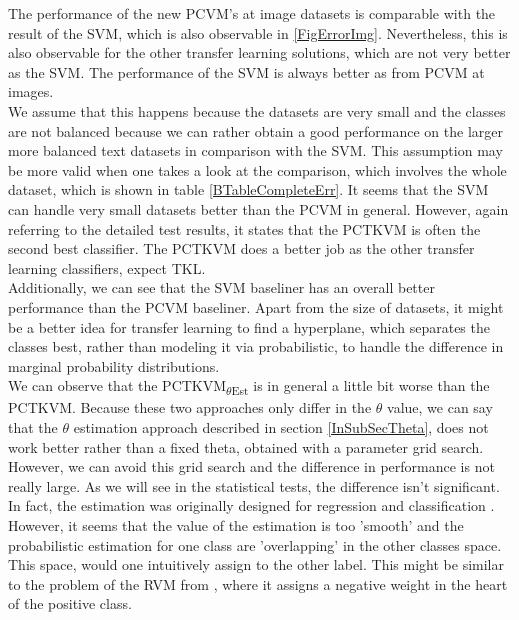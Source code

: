 \noindent
The performance of the new \acs{PCVM}'s at image datasets is comparable with the result of the \acs{SVM}, which is also observable in \ref{FigErrorImg}.
Nevertheless, this is also observable for the other transfer learning solutions, which are not very better as the \acs{SVM}.
The performance of the \acs{SVM} is always better as from \acs{PCVM} at images.\\
We assume that this happens because the datasets are very small and the classes are not balanced because we can rather obtain a good performance on the larger more balanced text datasets in comparison with the \acs{SVM}.
This assumption may be more valid when one takes a look at the comparison, which involves the whole dataset, which is shown in table \ref{BTableCompleteErr}.
It seems that the \acs{SVM} can handle very small datasets better than the \acs{PCVM} in general.
However, again referring to the detailed test results, it states that the \acs{PCTKVM} is often the second best classifier.
The \acs{PCTKVM} does a better job as the other transfer learning classifiers, expect \acs{TKL}.\\
Additionally, we can see that the \acs{SVM} baseliner has an overall better performance than the \acs{PCVM} baseliner.
Apart from the size of datasets, it might be a better idea for transfer learning to find a hyperplane, which separates the classes best, rather than modeling it via probabilistic, to handle the difference in marginal probability distributions.\\
We can observe that the \acs{PCTKVM}\textsubscript{$\theta$Est} is in general a little bit worse than the \acs{PCTKVM}. 
Because these two approaches only differ in the $\theta$ value, we can say that the $\theta$ estimation approach described in section \ref{InSubSecTheta}, does not work better rather than a fixed theta, obtained with a parameter grid search. However, we can avoid this grid search and the difference in performance is not really large. As we will see in the statistical tests, the difference isn't significant.
In fact, the estimation was originally designed for regression and classification \cite{Kitayama.2011}. However, it seems that the value of the estimation is too 'smooth' and the probabilistic estimation for one class are 'overlapping' in the other classes space.
This space, would one intuitively assign to the other label.
This might be similar to the problem of the \acs{RVM} from \cite{Chen.2009}, where it assigns a negative weight in the heart of the positive class.\\
